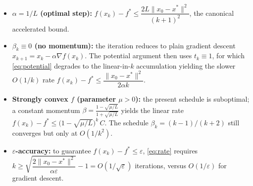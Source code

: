 \documentclass{article}
\begin{document}
\begin{itemize}
\item \textbf{$\alpha = 1/L$ (optimal step):}
      $f(x_k) - f^* \le \dfrac{2L\|x_0-x^*\|^2}{(k+1)^2}$, the canonical
      accelerated bound.

\item \textbf{$\beta_k \equiv 0$ (no momentum):} the iteration reduces to plain
      gradient descent $x_{k+1} = x_k - \alpha\nabla f(x_k)$. The potential
      argument then uses $t_k \equiv 1$, for which \eqref{eq:potential} degrades
      to the linear-in-$k$ accumulation yielding the slower $O(1/k)$ rate
      $f(x_k) - f^* \le \dfrac{\|x_0-x^*\|^2}{2\alpha k}$.

\item \textbf{Strongly convex $f$ (parameter $\mu>0$):} the present
      schedule is suboptimal; a constant momentum
      $\beta = \frac{1-\sqrt{\mu/L}}{1+\sqrt{\mu/L}}$ yields the linear rate
      $f(x_k) - f^* \le \big(1-\sqrt{\mu/L}\big)^{k}\,C$. The schedule
      $\beta_k=(k-1)/(k+2)$ still converges but only at $O(1/k^2)$.

\item \textbf{$\varepsilon$-accuracy:} to guarantee $f(x_k)-f^* \le \varepsilon$,
      \eqref{eq:rate} requires
      $k \ge \sqrt{\dfrac{2\|x_0-x^*\|^2}{\alpha\varepsilon}} - 1
      = O(1/\sqrt{\varepsilon})$ iterations, versus $O(1/\varepsilon)$ for
      gradient descent.
\end{itemize}

\end{document}
